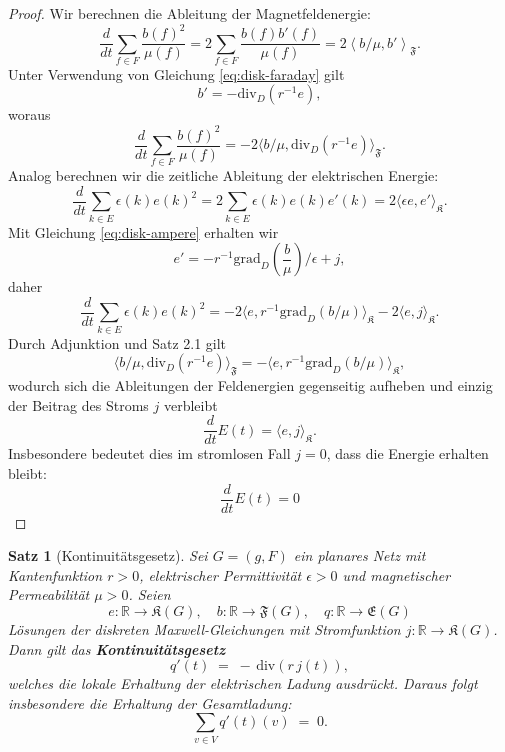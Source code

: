 \documentclass[11pt,a4paper,leqno]{report}
\newtheorem{proposition}{Satz}[chapter]
\numberwithin{equation}{chapter}
\begin{document}
\begin{proof}
	Wir berechnen die Ableitung der Magnetfeldenergie:
	\[
	\frac{d}{dt} \sum_{f \in F} \frac{b(f)^2}{\mu(f)} = 2 \sum_{f \in F} \frac{b(f) b'(f)}{\mu(f)} 
	= 2 \left\langle b/\mu, b' \right\rangle_{\mathfrak{F}}.
	\]
	Unter Verwendung von Gleichung \eqref{eq:disk-faraday} gilt
	\[
	b' = -\mathrm{div}_D(r^{-1} e),
	\]
	woraus
	\[
	\frac{d}{dt} \sum_{f \in F} \frac{b(f)^2}{\mu(f)} = - 2 \langle b/\mu, \mathrm{div}_D(r^{-1} e) \rangle_{\mathfrak{F}}.
	\]
	Analog berechnen wir die zeitliche Ableitung der elektrischen Energie:
	\[
	\frac{d}{dt} \sum_{k \in E} \epsilon(k) e(k)^2 = 2 \sum_{k \in E} \epsilon(k) e(k) e'(k) = 2 \langle \epsilon e, e' \rangle_{\mathfrak{K}}.
	\]
	Mit Gleichung \eqref{eq:disk-ampere} erhalten wir
	\[
	e' = - r^{-1} \mathrm{grad}_D \left(\frac{b}{\mu}\right) / \epsilon + j,
	\]
	daher
	\[
	\frac{d}{dt} \sum_{k \in E} \epsilon(k) e(k)^2 = - 2 \langle e, r^{-1} \mathrm{grad}_D (b/\mu) \rangle_{\mathfrak{K}} - 2\langle e, j\rangle_{\mathfrak{K}}.
	\]
	Durch Adjunktion und Satz 2.1 gilt
	\[
	\langle b/\mu, \mathrm{div}_D(r^{-1} e) \rangle_{\mathfrak{F}} = -\langle e, r^{-1} \mathrm{grad}_D (b/\mu) \rangle_{\mathfrak{K}},
	\]
	wodurch sich die Ableitungen der Feldenergien gegenseitig aufheben und einzig der Beitrag des Stroms 
	 \(j\) verbleibt
	\[
	\frac{d}{dt} E(t) = \langle e, j\rangle_{\mathfrak{K}}.
	\]
	Insbesondere bedeutet dies im stromlosen Fall \(j=0\), dass die Energie erhalten bleibt:
		\[
	\frac{d}{dt} E(t) = 0
	\]
\end{proof}
\begin{proposition}[Kontinuitätsgesetz]
	Sei \(G=(g,F)\) ein planares Netz mit Kantenfunktion \(r>0\), elektrischer Permittivität \(\epsilon>0\) 
	und magnetischer Permeabilität \(\mu>0\).  
	Seien 
	\[
	e : \mathbb{R} \to \mathfrak{K}(G), 
	\quad b : \mathbb{R} \to \mathfrak{F}(G), 
	\quad q : \mathbb{R} \to \mathfrak{E}(G)
	\]
	Lösungen der diskreten Maxwell-Gleichungen mit Stromfunktion \(j : \mathbb{R} \to \mathfrak{K}(G)\).  
	Dann gilt das \textbf{Kontinuitätsgesetz}
	\[
	q'(t) \;=\; -\,\mathrm{div}(r \, j(t)),
	\]
	welches die lokale Erhaltung der elektrischen Ladung ausdrückt. Daraus folgt insbesondere die Erhaltung der Gesamtladung:
	\[
	\sum_{v\in V} q'(t)(v) \;=\; 0.
	\]
\end{proposition}
\end{document}
